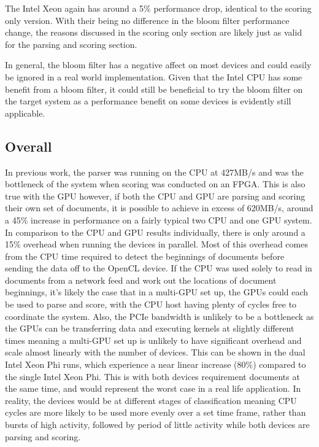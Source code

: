 The Intel Xeon again has around a 5\% performance drop, identical to the scoring
only version. With their being no difference in the bloom filter performance
change, the reasons discussed in the scoring only section are likely just as
valid for the parsing and scoring section.

In general, the bloom filter has a negative affect on most devices and could
easily be ignored in a real world implementation. Given that the Intel CPU
has some benefit from a bloom filter, it could still be beneficial to try the
bloom filter on the target system as a performance benefit on some devices is
evidently still applicable.

\subsection{Overall}

In previous work, the parser was running on the CPU at 427MB/s
\cite{HybridCPUFPGA} and was the bottleneck of the system when scoring was
conducted on an FPGA. This is also true with the GPU however, if both the CPU
and GPU are parsing and scoring their own set of documents, it is possible to
achieve in excess of 620MB/s, around a 45\% increase in performance on a fairly
typical two CPU and one GPU system. In comparison to the CPU and GPU results
individually, there is only around a 15\% overhead when running the devices in
parallel. Most of this overhead comes from the CPU time required to detect the
beginnings of documents before sending the data off to the OpenCL device. If the
CPU was used solely to read in documents from a network feed and work out the
locations of document beginnings, it's likely the case that in a multi-GPU set
up, the GPUs could each be used to parse and score, with the CPU host having
plenty of cycles free to coordinate the system. Also, the PCIe bandwidth is
unlikely to be a bottleneck as the GPUs can be transferring data and executing
kernels at slightly different times meaning a multi-GPU set up is unlikely to
have significant overhead and scale almost linearly with the number of devices.
This can be shown in the dual Intel Xeon Phi runs, which experience a near
linear increase (80\%) compared to the single Intel Xeon Phi. This is with both
devices requirement documents at the same time, and would represent the worst
case in a real life application. In reality, the devices would be at different
stages of classification meaning CPU cycles are more likely to be used more
evenly over a set time frame, rather than bursts of high activity, followed by
period of little activity while both devices are parsing and scoring.
